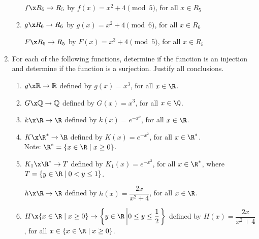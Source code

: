 \begin{enumerate}
\begin{enumerate}
\yitem $f\x R_5  \to R_5 $  by $f( x ) = x^2 + 4 \pmod 5$, for all 
$x \in R_5$

\item $g\x R_6  \to R_6$  by $g( x ) = x^2 + 4 \pmod 6$, for all 
$x \in R_6$

\yitem $F\x R_5  \to R_5 $  by $F( x ) = x^3 + 4 \pmod 5$, for all 
$x \in R_5$
\end{enumerate}

\item For each of the following functions, determine if the function is an injection and determine if the function is a surjection.  Justify all conclusions.\label{exer:sec63-5}

\begin{enumerate}
  \yitem $f\x\mathbb{Z} \to \mathbb{Z}$ defined by $f( x ) = 3x + 1$, for all $x \in \Z$.  

  \yitem $F\x\mathbb{Q} \to \mathbb{Q}$ defined by  $F( x ) = 3x + 1$, for all $x \in \Q$.  

  \item $g\x\mathbb{R} \to \mathbb{R}$ defined by  $g( x ) = x^3 $, for all $x \in \R$.  

  \item $G \x\mathbb{Q} \to \mathbb{Q}$ defined by  $G( x ) = x^3 $, for all $x \in \Q$.

  \item $k \x \R \to \R$ defined by $k(x) = e^{-x^2}$, for all $x \in \R$.

  \item $K\x \R^* \to \R$ defined by $K(x) = e^{-x^2}$, for all $x \in \R^*$.  \\Note:  $\R^* = \left\{ x \in \R \mid x \geq 0 \right\}$.
  
  \item $K_1 \x \R^* \to T$ defined by $K_1(x) = e^{-x^2}$, for all $x \in \R^*$, where $T = \left\{ y \in \R \mid 0 < y \leq 1 \right\}$.

  \yitem $h \x\R \to \R$ defined by $h ( x ) = \dfrac{2x}{x^2 + 4}$, for all $x \in \R$. 

  \item $H \x \{x \in \R \mid x \geq 0 \} \to \left\{ y \in \R \left| 0 \leq y \leq \dfrac{1}{2} \right. \right\}$ defined by \linebreak  
$H ( x ) = \dfrac{2x}{x^2 + 4}$, for all $x \in \{x \in \R \mid x \geq 0 \}$.
\end{enumerate} 


\end{enumerate}
